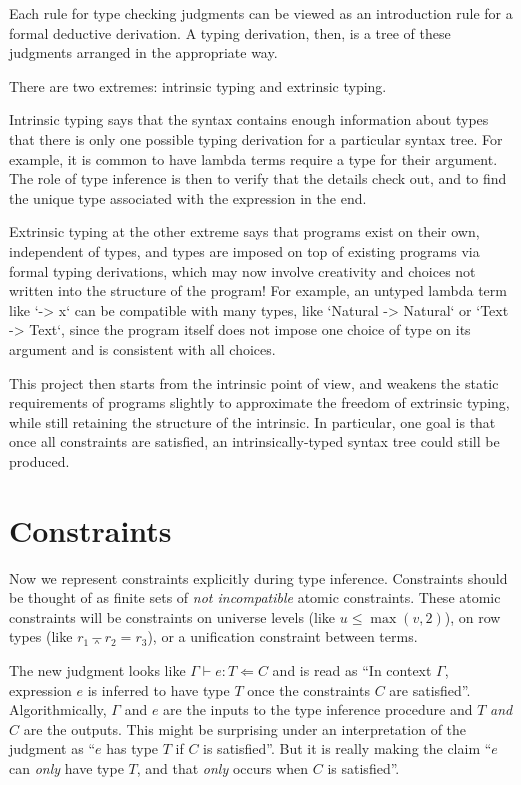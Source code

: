 \documentclass[11pt, twoside, reqno]{book}
\providecommand{\wedgeonwedge}{\barwedge}
\begin{document}
Each rule for type checking judgments can be viewed as an introduction rule for a formal deductive derivation.
A typing derivation, then, is a tree of these judgments arranged in the appropriate way.

There are two extremes: intrinsic typing and extrinsic typing.

Intrinsic typing says that the syntax contains enough information about types that there is only one possible typing derivation for a particular syntax tree.
For example, it is common to have lambda terms require a type for their argument.
The role of type inference is then to verify that the details check out, and to find the unique type associated with the expression in the end.

Extrinsic typing at the other extreme says that programs exist on their own, independent of types, and types are imposed on top of existing programs via formal typing derivations, which may now involve creativity and choices not written into the structure of the program!
For example, an untyped lambda term like \inHS`\x -> x` can be compatible with many types, like \inHS`Natural -> Natural` or \inHS`Text -> Text`, since the program itself does not impose one choice of type on its argument and is consistent with all choices.

This project then starts from the intrinsic point of view, and weakens the static requirements of programs slightly to approximate the freedom of extrinsic typing, while still retaining the structure of the intrinsic.
In particular, one goal is that once all constraints are satisfied, an intrinsically-typed syntax tree could still be produced.

\section{Constraints}

Now we represent constraints explicitly during type inference.
Constraints should be thought of as finite sets of \emph{not incompatible} atomic constraints.
These atomic constraints will be constraints on universe levels (like \(u \le \max(v, 2)\)), on row types (like \(r_1 \wedgeonwedge r_2 = r_3\)), or a unification constraint between terms.

The new judgment looks like \(\Gamma \vdash e : T \Leftarrow C\) and is read as ``In context \(\Gamma\), expression \(e\) is inferred to have type \(T\) once the constraints \(C\) are satisfied''.
Algorithmically, \(\Gamma\) and \(e\) are the inputs to the type inference procedure and \(T\) \emph{and} \(C\) are the outputs.
This might be surprising under an interpretation of the judgment as ``\(e\) has type \(T\) if \(C\) is satisfied''.
But it is really making the claim ``\(e\) can \emph{only} have type \(T\), and that \emph{only} occurs when \(C\) is satisfied''.
\end{document}
